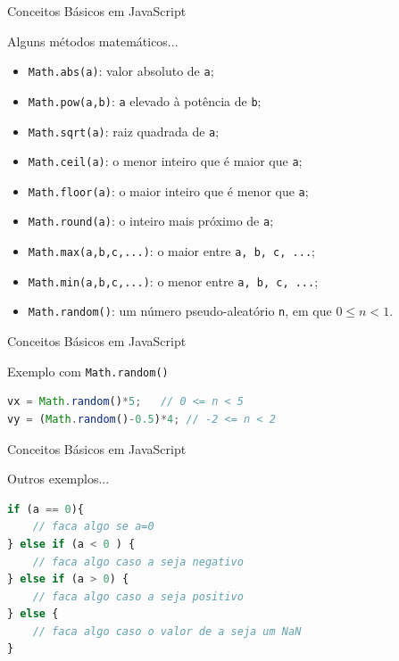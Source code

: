 \documentclass[xcolor=dvipsnames,table]{beamer}
\begin{document}
\begin{frame}[fragile]{Conceitos Básicos em JavaScript}
	\begin{block}{Alguns métodos matemáticos...}
		\begin{itemize}
			\item {\tt Math.abs(a)}: valor absoluto de {\tt a}; \pause
			\item {\tt Math.pow(a,b)}: {\tt a} elevado à potência de {\tt b}; \pause
			\item {\tt Math.sqrt(a)}: raiz quadrada de {\tt a}; \pause
			\item {\tt Math.ceil(a)}: o menor inteiro que é maior que {\tt a}; \pause
			\item {\tt Math.floor(a)}: o maior inteiro que é menor que {\tt a}; \pause
			\item {\tt Math.round(a)}: o inteiro mais próximo de {\tt a}; \pause 
			\item {\tt Math.max(a,b,c,...)}: o maior entre {\tt a, b, c, ...}; \pause
			\item {\tt Math.min(a,b,c,...)}: o menor entre {\tt a, b, c, ...}; \pause
			\item {\tt Math.random()}: um número pseudo-aleatório {\tt n}, em que $0 \leq n < 1$.
		\end{itemize}
	\end{block}
\end{frame}

\begin{frame}[fragile]{Conceitos Básicos em JavaScript}
	\begin{block}{Exemplo com {\tt Math.random()}}
		\begin{lstlisting}[language=JavaScript]
vx = Math.random()*5;	// 0 <= n < 5
vy = (Math.random()-0.5)*4;	// -2 <= n < 2
\end{lstlisting}	
	\end{block}
\end{frame}

\begin{frame}[fragile]{Conceitos Básicos em JavaScript}
	\begin{block}{Outros exemplos...}
		\begin{lstlisting}[language=JavaScript]
if (a == 0){
	// faca algo se a=0
} else if (a < 0 ) {
	// faca algo caso a seja negativo
} else if (a > 0) {
	// faca algo caso a seja positivo
} else {
	// faca algo caso o valor de a seja um NaN
}
\end{lstlisting}	
	\end{block}
\end{frame}
\end{document}
